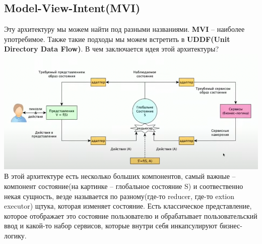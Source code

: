 \documentclass{article}
\begin{document}
    \subsection{Model-View-Intent(MVI)}
    Эту архитектуру мы можем найти под разными названиями. \textbf{MVI} -- наиболее употребимое. Также такие подходы мы можем встретить в \textbf{UDDF(Unit Directory Data Flow)}.
    \newline
    В чем заключается идея этой архитектуры? 
    \newline
    \includegraphics[scale = 0.5]{pic/Снимок экрана 2023-07-30 в 21.39.55.png}
    \newline
    В этой архитектуре есть несколько больших компонентов, самый важные -- компонент состояние(на картинке -- глобальное состояние S) и соотвественно некая сущность, везде называется по разному(где-то reducer, где-то extion executor) щтука, которая изменяет состояние. Есть классическое представление, которое отображает это состояние пользователю и обрабатывает пользовательский ввод и какой-то набор сервисов, которые внутри себя инкапсулируют бизнес-логику. 
\end{document}

